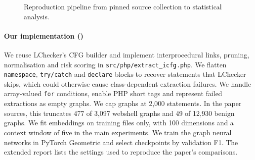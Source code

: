 \begin{figure}[!t]
\centering
{}
\caption{Reproduction pipeline from pinned source collection to statistical analysis.}
\label{fig:pipeline}
\end{figure}

\paragraph{Our implementation ()}
We reuse LChecker's CFG builder and implement interprocedural links, pruning, normalisation and risk scoring
in \texttt{src/php/extract\_icfg.php}. We flatten \texttt{namespace}, \texttt{try/catch} and \texttt{declare}
blocks to recover statements that LChecker skips, which could otherwise cause class-dependent extraction failures.
We handle array-valued \texttt{for} conditions, enable PHP short tags and represent failed extractions as empty
graphs. We cap graphs at 2,000 statements. In the paper sources, this truncates 477 of 3,097 webshell graphs
and 49 of 12,930 benign graphs. We fit embeddings on training files only, with 100 dimensions and a context
window of five in the main experiments. We train the graph neural networks in PyTorch Geometric and select
checkpoints by validation F1. The extended report lists the settings used to reproduce the paper's comparisons.

